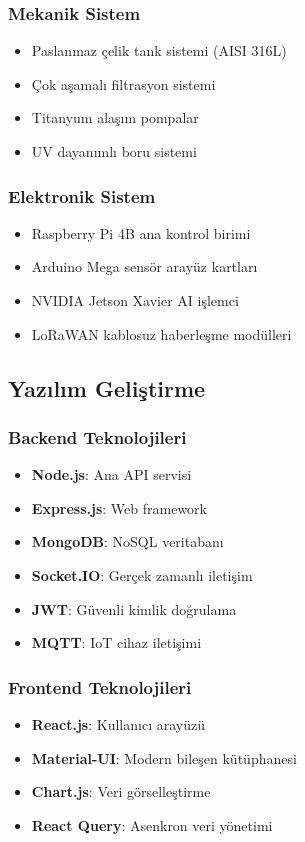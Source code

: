 \documentclass[12pt,a4paper]{article}
\begin{document}
\subsubsection{Mekanik Sistem}
\begin{itemize}
    \item Paslanmaz çelik tank sistemi (AISI 316L)
    \item Çok aşamalı filtrasyon sistemi
    \item Titanyum alaşım pompalar
    \item UV dayanımlı boru sistemi
\end{itemize}

\subsubsection{Elektronik Sistem}
\begin{itemize}
    \item Raspberry Pi 4B ana kontrol birimi
    \item Arduino Mega sensör arayüz kartları
    \item NVIDIA Jetson Xavier AI işlemci
    \item LoRaWAN kablosuz haberleşme modülleri
\end{itemize}

\subsection{Yazılım Geliştirme}

\subsubsection{Backend Teknolojileri}
\begin{itemize}
    \item \textbf{Node.js}: Ana API servisi
    \item \textbf{Express.js}: Web framework
    \item \textbf{MongoDB}: NoSQL veritabanı
    \item \textbf{Socket.IO}: Gerçek zamanlı iletişim
    \item \textbf{JWT}: Güvenli kimlik doğrulama
    \item \textbf{MQTT}: IoT cihaz iletişimi
\end{itemize}

\subsubsection{Frontend Teknolojileri}
\begin{itemize}
    \item \textbf{React.js}: Kullanıcı arayüzü
    \item \textbf{Material-UI}: Modern bileşen kütüphanesi
    \item \textbf{Chart.js}: Veri görselleştirme
    \item \textbf{React Query}: Asenkron veri yönetimi
\end{itemize}
\end{document}
